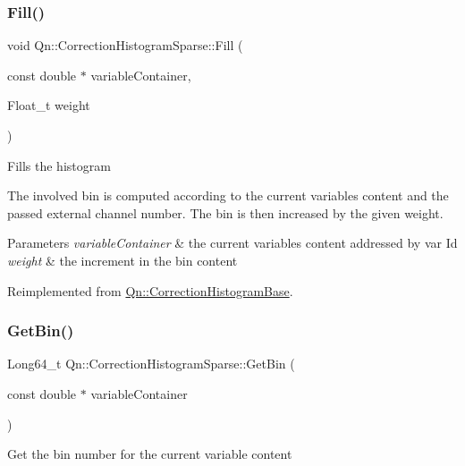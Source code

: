 \subsubsection{\texorpdfstring{Fill()}{Fill()}}
{\footnotesize\ttfamily void Qn\+::\+Correction\+Histogram\+Sparse\+::\+Fill (\begin{DoxyParamCaption}\item[{const double $\ast$}]{variable\+Container,  }\item[{Float\+\_\+t}]{weight }\end{DoxyParamCaption})\hspace{0.3cm}{\ttfamily [virtual]}}

Fills the histogram

The involved bin is computed according to the current variables content and the passed external channel number. The bin is then increased by the given weight.


\begin{DoxyParams}{Parameters}
{\em variable\+Container} & the current variables content addressed by var Id \\
\hline
{\em weight} & the increment in the bin content \\
\hline
\end{DoxyParams}


Reimplemented from \mbox{\hyperlink{classQn_1_1CorrectionHistogramBase_a16b7518942714780ec9ceb56bb517f0f}{Qn\+::\+Correction\+Histogram\+Base}}.

\mbox{\label{classQn_1_1CorrectionHistogramSparse_aea9b7cdd8ad93d5fb14c00b20848dcdc}} 
\subsubsection{\texorpdfstring{Get\+Bin()}{GetBin()}}
{\footnotesize\ttfamily Long64\+\_\+t Qn\+::\+Correction\+Histogram\+Sparse\+::\+Get\+Bin (\begin{DoxyParamCaption}\item[{const double $\ast$}]{variable\+Container }\end{DoxyParamCaption})\hspace{0.3cm}{\ttfamily [virtual]}}

Get the bin number for the current variable content

